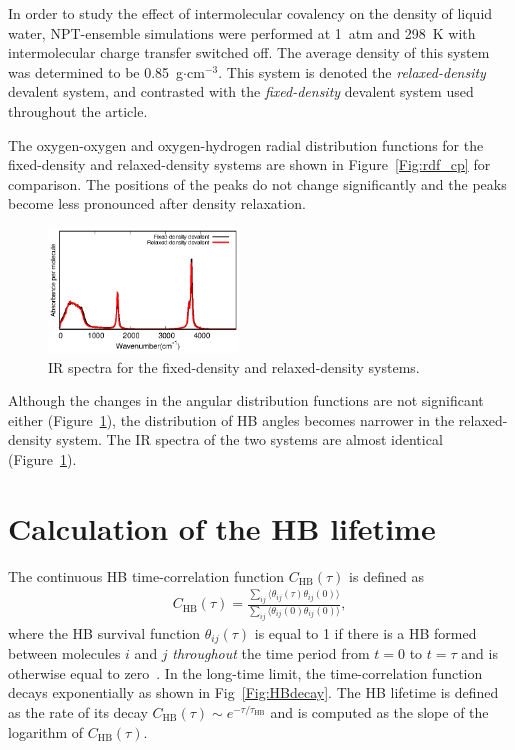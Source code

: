 \documentclass[journal=jacsat,manuscript=article]{achemso}
\newcommand{\bea}{\begin{eqnarray}}
\newcommand{\eea}{\end{eqnarray}}
\begin{document}
In order to study the effect of intermolecular covalency on the density of liquid water, NPT-ensemble simulations were performed at 1~atm and 298~K with intermolecular charge transfer switched off. The average density of this system was determined to be 0.85~g$\cdot$cm$^{-3}$. 
This system is denoted the \emph{relaxed-density} devalent system, and contrasted with the \emph{fixed-density} devalent system used throughout the article. 

The oxygen-oxygen and oxygen-hydrogen radial distribution functions for the fixed-density and relaxed-density systems are shown in Figure~\ref{Fig:rdf_cp} for comparison. 
The positions of the peaks do not change significantly and the peaks become less pronounced after density relaxation.

\begin{figure}
\includegraphics[width=0.45\textwidth]{cp_ir}
\caption{
IR spectra for the fixed-density and relaxed-density systems.}\label{Fig:ir_cp}
\end{figure} 

Although the changes in the angular distribution functions are not significant either (Figure~\ref{Fig:ir_cp}), the distribution of HB angles becomes narrower in the relaxed-density system. The IR spectra of the two systems are almost identical (Figure~\ref{Fig:ir_cp}).

%

\section{Calculation of the HB lifetime} 

The continuous HB time-correlation function $C_{\text{HB}}(\tau)$ is defined as 
%
\bea
C_{\text{HB}}(\tau) = \frac{\sum_{ij}\langle \theta_{ij}(\tau)\theta_{ij}(0) \rangle}{\sum_{ij}\langle \theta_{ij}(0) \theta_{ij}(0) \rangle} \label{Eq:HBdecay},
\eea
%
where the HB survival function $\theta_{ij}(\tau)$ is equal to 1 if there is a HB formed between molecules $i$ and $j$ \emph{throughout} the time period from $t=0$ to $t=\tau$ and is otherwise equal to zero~\cite{rapaport1983hydrogen,starr1999fast}. 
In the long-time limit, the time-correlation function decays exponentially as shown in Fig~\ref{Fig:HBdecay}. 
The HB lifetime is defined as the rate of its decay $C_{\text{HB}}(\tau) \sim e^{-\tau/\tau_{\text{HB}}}$ and is computed as the slope of the logarithm of $C_{\text{HB}}(\tau)$.
\end{document}
